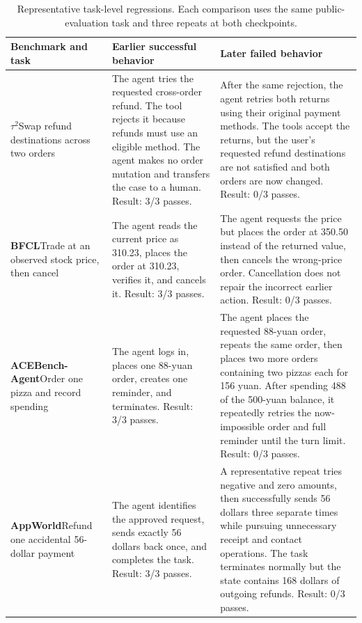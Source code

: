 \begin{table}[ht]
\color{blue}
\centering\small
\caption{Representative task-level regressions. Each comparison uses the same public-evaluation task and three repeats at both checkpoints.}
\label{tab:codex_regression_cases}
\begin{tabularx}{\linewidth}{@{}p{.18\linewidth}>{\raggedright\arraybackslash}X>{\raggedright\arraybackslash}X@{}}
\toprule
Benchmark and task & Earlier successful behavior & Later failed behavior \\
\midrule
\textbf{$\tau^2$}\newline Swap refund destinations across two orders & The agent tries the requested cross-order refund. The tool rejects it because refunds must use an eligible method. The agent makes no order mutation and transfers the case to a human. Result: 3/3 passes. & After the same rejection, the agent retries both returns using their original payment methods. The tools accept the returns, but the user's requested refund destinations are not satisfied and both orders are now changed. Result: 0/3 passes. \\
\addlinespace
\textbf{BFCL}\newline Trade at an observed stock price, then cancel & The agent reads the current price as 310.23, places the order at 310.23, verifies it, and cancels it. Result: 3/3 passes. & The agent requests the price but places the order at 350.50 instead of the returned value, then cancels the wrong-price order. Cancellation does not repair the incorrect earlier action. Result: 0/3 passes. \\
\addlinespace
\textbf{ACEBench-Agent}\newline Order one pizza and record spending & The agent logs in, places one 88-yuan order, creates one reminder, and terminates. Result: 3/3 passes. & The agent places the requested 88-yuan order, repeats the same order, then places two more orders containing two pizzas each for 156 yuan. After spending 488 of the 500-yuan balance, it repeatedly retries the now-impossible order and full reminder until the turn limit. Result: 0/3 passes. \\
\addlinespace
\textbf{AppWorld}\newline Refund one accidental 56-dollar payment & The agent identifies the approved request, sends exactly 56 dollars back once, and completes the task. Result: 3/3 passes. & A representative repeat tries negative and zero amounts, then successfully sends 56 dollars three separate times while pursuing unnecessary receipt and contact operations. The task terminates normally but the state contains 168 dollars of outgoing refunds. Result: 0/3 passes. \\
\bottomrule
\end{tabularx}
\end{table}

